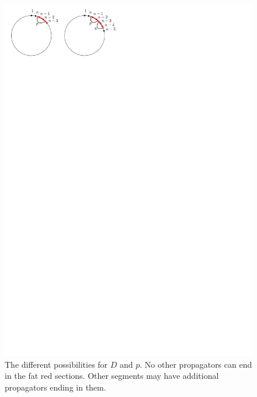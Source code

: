 \documentclass[11pt]{article}
\theoremstyle{remark}
\theoremstyle{definition}
\begin{document}
\begin{figure}
  \includegraphics{specialp}
  \caption{The different possibilities for $D$ and $p$.  No other propagators can end in the fat red sections.  Other segments may have additional propagators ending in them.}\label{fig special p}
\end{figure}
\end{document}

